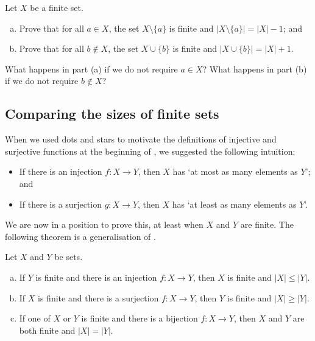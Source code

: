 \begin{exercise}
\label{exAddRemoveElementsOfFiniteSets}
Let $X$ be a finite set.
\begin{enumerate}[(a)]
\item Prove that for all $a \in X$, the set $X \setminus \{ a \}$ is finite and $|X \setminus \{ a \}| = |X|-1$; and
\item Prove that for all $b \not\in X$, the set $X \cup \{ b \}$ is finite and $|X \cup \{ b \}| = |X|+1$.
\end{enumerate}
What happens in part (a) if we do not require $a \in X$? What happens in part (b) if we do not require $b \not\in X$?
\end{exercise}

\subsection*{Comparing the sizes of finite sets}

When we used dots and stars to motivate the definitions of injective and surjective functions at the beginning of , we suggested the following intuition:
\begin{itemize} 
\item If there is an injection $f : X \to Y$, then $X$ has `at most as many elements as $Y$'; and
\item If there is a surjection $g : X \to Y$, then $X$ has `at least as many elements as $Y$'.
\end{itemize}

We are now in a position to prove this, at least when $X$ and $Y$ are finite. The following theorem is a generalisation of .

\begin{theorem}
\label{thmFiniteSetsAndJections}
Let $X$ and $Y$ be sets.
\begin{enumerate}[(a)]
\item If $Y$ is finite and there is an injection $f : X \to Y$, then $X$ is finite and $|X| \le |Y|$.
\item If $X$ is finite and there is a surjection $f : X \to Y$, then $Y$ is finite and $|X| \ge |Y|$.
\item If one of $X$ or $Y$ is finite and there is a bijection $f : X \to Y$, then $X$ and $Y$ are both finite and $|X| = |Y|$.
\end{enumerate}
\end{theorem}

